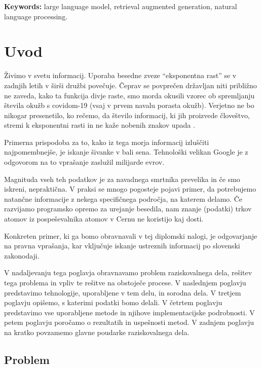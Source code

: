 \documentclass[a4paper,12pt,openright]{book}
\newcommand{\tkeywordsEn}{large language model, retrieval augmented generation, natural language processing}
\newcommand{\clearemptydoublepage}{\newpage{\pagestyle{empty}\cleardoublepage}}
\begin{document}
\noindent\textbf{Keywords:} \tkeywordsEn.
\clearemptydoublepage

\mainmatter
\setcounter{page}{1}
\pagestyle{fancy}

\chapter{Uvod}
\label{ch0}

Živimo v svetu informacij. Uporaba besedne zveze “eksponentna rast” se v zadnjih letih v širši družbi povečuje. Čeprav se povprečen državljan niti približno ne zaveda, kako ta funkcija divje raste, smo morda okusili vzorec ob spremljanju števila okužb s covidom-19 (vsaj v prvem navalu porasta okužb). Verjetno ne bo nikogar presenetilo, ko rečemo, da število informacij, ki jih proizvede človeštvo, stremi k eksponentni rasti in ne kaže nobenih znakov upada \cite{big_data}.

Primerna prispodoba za to, kako iz tega morja informacij izluščiti najpomembnejše, je iskanje šivanke v bali sena. Tehnološki velikan Google je z odgovorom na to vprašanje zaslužil milijarde evrov.

Magnituda vseh teh podatkov je za navadnega smrtnika prevelika in če smo iskreni, nepraktična. V praksi se mnogo pogosteje pojavi primer, da potrebujemo natančne informacije z nekega specifičnega področja, na katerem delamo. Če razvijamo programsko opremo za urejanje besedila, nam znanje (podatki) trkov atomov iz pospeševalnika atomov v Cernu ne koristijo kaj dosti.

Konkreten primer, ki ga bomo obravnavali v tej diplomski nalogi, je odgovarjanje na pravna vprašanja, kar vključuje iskanje ustreznih informacij po slovenski zakonodaji.

V nadaljevanju tega poglavja obravnavamo problem raziskovalnega dela, rešitev tega problema in vpliv te rešitve na obstoječe procese. V naslednjem poglavju predstavimo tehnologije, uporabljene v tem delu, in sorodna dela. V tretjem poglavju opišemo, s katerimi podatki bomo delali. V četrtem poglavju predstavimo vse uporabljene metode in njihove implementacijske podrobnosti. V petem poglavju poročamo o rezultatih in uspešnosti metod. V zadnjem poglavju na kratko povzamemo glavne poudarke raziskovalnega dela.

\section{Problem}
\end{document}
